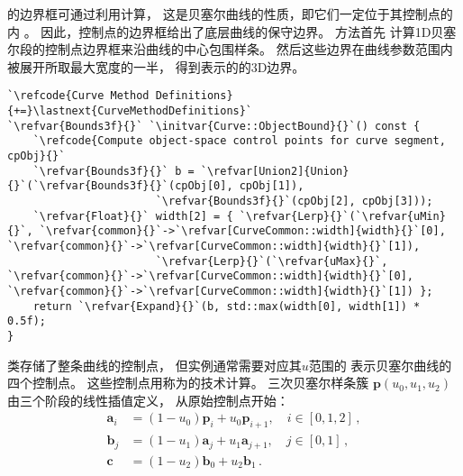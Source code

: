 的边界框可通过利用计算，
这是贝塞尔曲线的性质，即它们一定位于其控制点的内
。
因此，控制点的边界框给出了底层曲线的保守边界。
方法首先
计算1D贝塞尔段的控制点边界框来沿曲线的中心包围样条。
然后这些边界在曲线参数范围内被展开所取最大宽度的一半，
得到表示的的3D边界。
\begin{lstlisting}
`\refcode{Curve Method Definitions}{+=}\lastnext{CurveMethodDefinitions}`
`\refvar{Bounds3f}{}` `\initvar{Curve::ObjectBound}{}`() const {
    `\refcode{Compute object-space control points for curve segment, cpObj}{}`
    `\refvar{Bounds3f}{}` b = `\refvar[Union2]{Union}{}`(`\refvar{Bounds3f}{}`(cpObj[0], cpObj[1]),
                       `\refvar{Bounds3f}{}`(cpObj[2], cpObj[3]));
    `\refvar{Float}{}` width[2] = { `\refvar{Lerp}{}`(`\refvar{uMin}{}`, `\refvar{common}{}`->`\refvar[CurveCommon::width]{width}{}`[0], `\refvar{common}{}`->`\refvar[CurveCommon::width]{width}{}`[1]),
                       `\refvar{Lerp}{}`(`\refvar{uMax}{}`, `\refvar{common}{}`->`\refvar[CurveCommon::width]{width}{}`[0], `\refvar{common}{}`->`\refvar[CurveCommon::width]{width}{}`[1]) };
    return `\refvar{Expand}{}`(b, std::max(width[0], width[1]) * 0.5f);
}
\end{lstlisting}

类存储了整条曲线的控制点，
但实例通常需要对应其$u$范围的
表示贝塞尔曲线的四个控制点。
这些控制点用称为的技术计算。
三次贝塞尔样条簇
$\bm p(u_0,u_1,u_2)$由三个阶段的线性插值定义，
从原始控制点开始：
\begin{align}\label{eq:3.4}
    \bm a_i & =(1-u_0)\bm p_i+u_0\bm p_{i+1},\quad i\in[0,1,2]\nonumber\, , \\
    \bm b_j & =(1-u_1)\bm a_j+u_1\bm a_{j+1},\quad j\in[0,1]\nonumber\, ,   \\
    \bm c   & =(1-u_2)\bm b_0+u_2\bm b_1\, .
\end{align}

